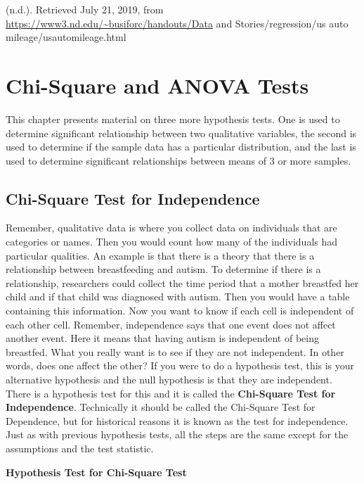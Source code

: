 \documentclass[]{book}
\begin{document}
(n.d.). Retrieved July 21, 2019, from \url{https://www3.nd.edu/~busiforc/handouts/Data} and Stories/regression/us auto mileage/usautomileage.html

\hypertarget{chi-square-and-anova-tests}{%
\chapter{Chi-Square and ANOVA Tests}\label{chi-square-and-anova-tests}}

This chapter presents material on three more hypothesis tests. One is used to determine significant relationship between two qualitative variables, the second is used to determine if the sample data has a particular distribution, and the last is used to determine significant relationships between means of 3 or more samples.

\hypertarget{chi-square-test-for-independence}{%
\section{Chi-Square Test for Independence}\label{chi-square-test-for-independence}}

Remember, qualitative data is where you collect data on individuals that are categories or names. Then you would count how many of the individuals had particular qualities. An example is that there is a theory that there is a relationship between breastfeeding and autism. To determine if there is a relationship, researchers could collect the time period that a mother breastfed her child and if that child was diagnosed with autism. Then you would have a table containing this information. Now you want to know if each cell is independent of each other cell. Remember, independence says that one event does not affect another event. Here it means that having autism is independent of being breastfed. What you really want is to see if they are not independent. In other words, does one affect the other? If you were to do a hypothesis test, this is your alternative hypothesis and the null hypothesis is that they are independent. There is a hypothesis test for this and it is called the \textbf{Chi-Square Test for Independence}. Technically it should be called the Chi-Square Test for Dependence, but for historical reasons it is known as the test for independence. Just as with previous hypothesis tests, all the steps are the same except for the assumptions and the test statistic.

\textbf{Hypothesis Test for Chi-Square Test}
\end{document}
